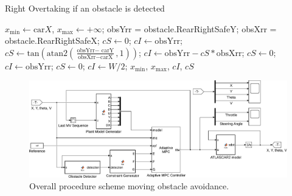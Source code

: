 \begin{algorithm}%
	\caption{Right Overtaking if an obstacle is detected}
	\small
	\begin{algorithmic}[1]
		\State $x_\text{min} \gets \text{car}X $,  $x_\text{max} \gets +\infty$;
		\State obsYrr = obstacle.RearRightSafeY;
		\State obsXrr = obstacle.RearRightSafeX;
		\State $cS \gets 0$; $cI \gets \text{obsYrr}$;
		\Else
		\State $cS \gets \text{tan}(\text{atan2}(\frac{\text{obsYrr}-\text{ carY}}{\text{obsXrr}-\text{carX}},1))$;
		\State $cI \gets \text{obsYrr}-cS*\text{obsXrr}$;
		\EndIf
		\Else
		\State $cS \gets 0$; $cI \gets \text{obsYrr}$;
		\Else
		\State $cS \gets 0$; $cI \gets W/2$;
		\EndIf
		\EndIf
		\State \Return $x_\text{min}$, $x_\text{max}$, $cI$, $cS$
		\EndFunction
	\end{algorithmic}
	\label{alg:rightOvertaking}
\end{algorithm}
\begin{figure}[!h]
	\centering
	\includegraphics[width=\textwidth]{../figure/MovingObstacleAvoidance.pdf}
	\caption{Overall procedure scheme moving obstacle avoidance.}
	\label{fig:MovingObstacleAvoidance}
\end{figure}
